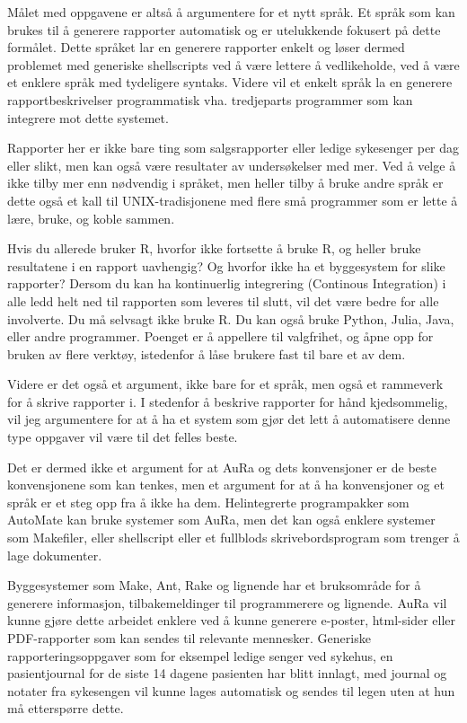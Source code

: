 \documentclass[11pt]{article}
\begin{document}
Målet med oppgavene er altså å argumentere for et nytt språk. Et språk som kan brukes til å generere rapporter automatisk og er utelukkende fokusert på dette formålet. Dette språket lar en generere rapporter enkelt og løser dermed problemet med generiske shellscripts ved å være lettere å vedlikeholde, ved å være et enklere språk med tydeligere syntaks. Videre vil et enkelt språk la en generere rapportbeskrivelser programmatisk vha. tredjeparts programmer som kan integrere mot dette systemet.



Rapporter her er ikke bare ting som salgsrapporter eller ledige sykesenger per dag eller slikt, men kan også være resultater av undersøkelser med mer.
Ved å velge å ikke tilby mer enn nødvendig i språket, men heller tilby å bruke andre språk er dette også et kall til UNIX-tradisjonene med flere små programmer som er lette å lære, bruke, og koble sammen.



Hvis du allerede bruker R, hvorfor ikke fortsette å bruke R, og heller bruke resultatene i en rapport uavhengig? Og hvorfor ikke ha et byggesystem for slike rapporter? Dersom du kan ha kontinuerlig integrering (Continous Integration) i alle ledd helt ned til rapporten som leveres til slutt, vil det være bedre for alle involverte. Du må selvsagt ikke bruke R. Du kan også bruke Python, Julia, Java, eller andre programmer. Poenget er å appellere til valgfrihet, og åpne opp for bruken av flere verktøy, istedenfor å låse brukere fast til bare et av dem.



Videre er det også et argument, ikke bare for et språk, men også et rammeverk for å skrive rapporter i. I stedenfor å beskrive rapporter for hånd kjedsommelig, vil jeg argumentere for at å ha et system som gjør det lett å automatisere denne type oppgaver vil være til det felles beste.



Det er dermed ikke et argument for at AuRa og dets konvensjoner er de beste konvensjonene som kan tenkes, men et argument for at å ha konvensjoner og et språk er et steg opp fra å ikke ha dem. Helintegrerte programpakker som AutoMate kan bruke systemer som AuRa, men det kan også enklere systemer som Makefiler, eller shellscript eller et fullblods skrivebordsprogram som trenger å lage dokumenter.



Byggesystemer som Make, Ant, Rake og lignende har et bruksområde for å generere informasjon, tilbakemeldinger til programmerere og lignende. AuRa vil kunne gjøre dette arbeidet enklere ved å kunne generere e-poster, html-sider eller PDF-rapporter som kan sendes til relevante mennesker.
Generiske rapporteringsoppgaver som for eksempel ledige senger ved sykehus, en pasientjournal for de siste 14 dagene pasienten har blitt innlagt, med journal og notater fra sykesengen vil kunne lages automatisk og sendes til legen uten at hun må etterspørre dette.
\end{document}
